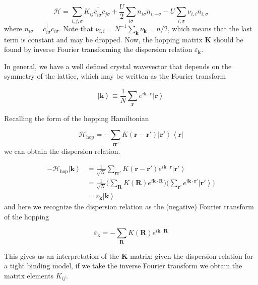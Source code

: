 \begin{equation}
\mathcal{H} = \sum_{i, j, \sigma} K_{ij} c_{i\sigma}^\dagger c_{j\sigma} + \frac{U}{2} \sum_{i\sigma} n_{i\sigma} n_{i, -\sigma} - U \sum_{i, \sigma} \nu_{i, i} n_{i, \sigma}
\end{equation}
where $n_{i\sigma} = c_{i\sigma}^\dagger c_{i\sigma}$. Note that $\nu_{i, i} = N^{-1} \sum_{\bm k} \nu_{\bm k} = n/2$, which means that the last term is constant and may be dropped. Now, the hopping matrix $\bm K$ should be found by inverse Fourier transforming the dispersion relation $\varepsilon_{\bm k}$.

In general, we have a well defined crystal wavevector that depends on the symmetry of the lattice, which may be written as the Fourier transform

\begin{equation}
\left| \bm k \right\rangle \equiv \frac{1}{N} \sum_{\bm r} e^{i\bm k \cdot \bm r} \left| \bm r \right\rangle
\end{equation}

Recalling the form of the hopping Hamiltonian

\begin{equation}
\mathcal{H}_{\text{hop}} = - \sum_{\bm r \bm r'} K (\bm r - \bm r') \left| \bm r' \right\rangle \left\langle \bm r \right|
\end{equation}
we can obtain the dispersion relation.

\begin{equation}
\begin{split}
- \mathcal{H}_{\text{hop}} \left| \bm k \right\rangle &= \frac{1}{\sqrt{N}} \sum_{\bm r \bm r'} K ( \bm r - \bm r' ) e^{i \bm k \cdot \bm r} \left| \bm r' \right \rangle \\
&= \frac{1}{\sqrt{N}} \bigg( \sum_{\bm R} K(\bm R) e^{i\bm k \cdot \bm R} \bigg) \bigg( \sum_{\bm r'} e^{i\bm k \cdot \bm r'} \left| \bm r' \right\rangle \bigg) \\
& = \varepsilon_{\bm k} \left| \bm k \right\rangle
\end{split}
\end{equation}
and here we recognize the dispersion relation as the (negative) Fourier transform of the hopping

\begin{equation}
\varepsilon_{\bm k} = - \sum_{\bm R} K(\bm R) e^{i\bm k \cdot \bm R} 
\end{equation}

This gives us an interpretation of the $\bm K$ matrix: given the dispersion relation for a tight binding model, if we take the inverse Fourier transform we obtain the matrix elements $K_{i j}$.

